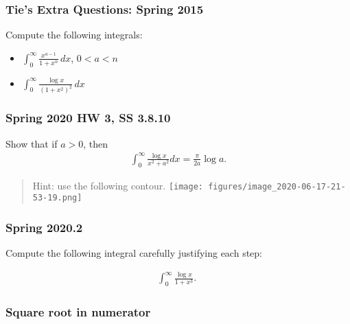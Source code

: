 \hypertarget{ties-extra-questions-spring-2015-1}{%
\subsubsection{Tie's Extra Questions: Spring
2015}\label{ties-extra-questions-spring-2015-1}}

Compute the following integrals:

\begin{itemize}
\tightlist
\item
  \(\displaystyle \int_0^\infty \frac{x^{a-1}}{1 + x^n} \, dx\),
  \(0< a < n\)
\item
  \(\displaystyle \int_0^\infty \frac{\log x}{(1 + x^2)^2}\, dx\)
\end{itemize}

\hypertarget{spring-2020-hw-3-ss-3.8.10}{%
\subsubsection{Spring 2020 HW 3, SS
3.8.10}\label{spring-2020-hw-3-ss-3.8.10}}

Show that if \(a>0\), then
\begin{align*}
\int_{0}^{\infty} \frac{\log x}{x^{2}+a^{2}} d x=\frac{\pi}{2 a} \log a
.\end{align*}

\begin{quote}
Hint: use the following contour.
\texttt{[image: figures/image\_2020-06-17-21-53-19.png]}
\end{quote}

\hypertarget{spring-2020.2}{%
\subsubsection{Spring 2020.2}\label{spring-2020.2}}

\begin{problem}[?]

Compute the following integral carefully justifying each step:

\begin{align*}
\int_{0}^{\infty} \frac{\log x}{1+x^{3}} \text {. }
\end{align*}

\end{problem}

\hypertarget{square-root-in-numerator}{%
\subsubsection{Square root in
numerator}\label{square-root-in-numerator}}

